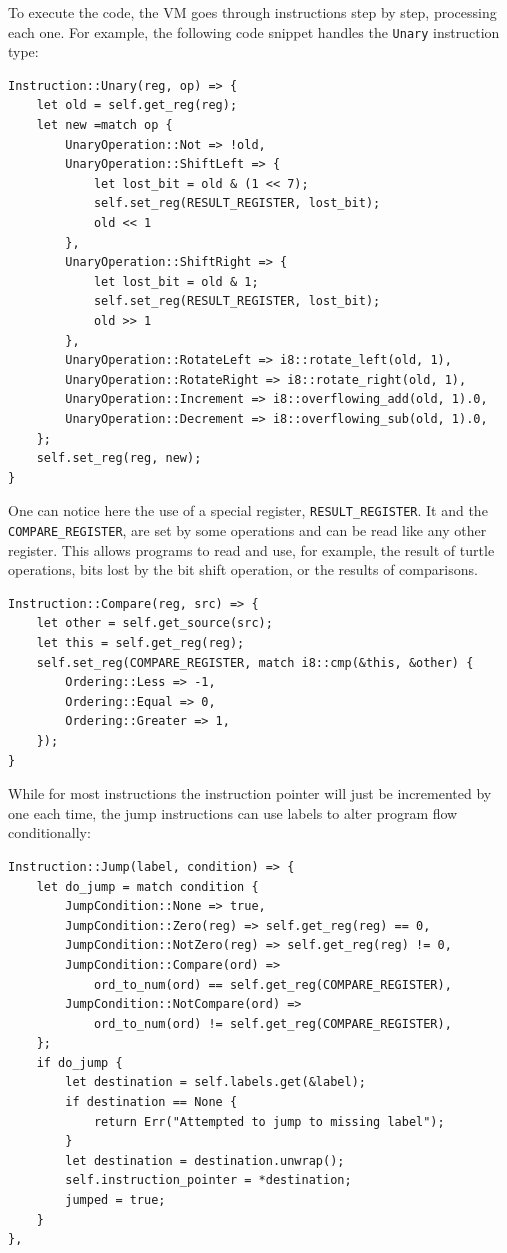 \documentclass{report}
\begin{document}
To execute the code, the VM goes through instructions step by step, processing each one. For example, the following code snippet handles the \verb|Unary| instruction type:

\begin{verbatim}
Instruction::Unary(reg, op) => {
    let old = self.get_reg(reg);
    let new =match op {
        UnaryOperation::Not => !old,
        UnaryOperation::ShiftLeft => {
            let lost_bit = old & (1 << 7);
            self.set_reg(RESULT_REGISTER, lost_bit);
            old << 1
        },
        UnaryOperation::ShiftRight => {
            let lost_bit = old & 1;
            self.set_reg(RESULT_REGISTER, lost_bit);
            old >> 1
        },
        UnaryOperation::RotateLeft => i8::rotate_left(old, 1),
        UnaryOperation::RotateRight => i8::rotate_right(old, 1),
        UnaryOperation::Increment => i8::overflowing_add(old, 1).0,
        UnaryOperation::Decrement => i8::overflowing_sub(old, 1).0,
    };
    self.set_reg(reg, new);
}
\end{verbatim}

One can notice here the use of a special register, \verb|RESULT_REGISTER|. It and the \verb|COMPARE_REGISTER|, are set by some operations and can be read like any other register. This allows programs to read and use, for example, the result of turtle operations, bits lost by the bit shift operation, or the results of comparisons.

\begin{verbatim}
Instruction::Compare(reg, src) => {
    let other = self.get_source(src);
    let this = self.get_reg(reg);
    self.set_reg(COMPARE_REGISTER, match i8::cmp(&this, &other) {
        Ordering::Less => -1,
        Ordering::Equal => 0,
        Ordering::Greater => 1,
    });
}
\end{verbatim}

While for most instructions the instruction pointer will just be incremented by one each time, the jump instructions can use labels to alter program flow conditionally:

\begin{verbatim}
Instruction::Jump(label, condition) => {
    let do_jump = match condition {
        JumpCondition::None => true,
        JumpCondition::Zero(reg) => self.get_reg(reg) == 0,
        JumpCondition::NotZero(reg) => self.get_reg(reg) != 0,
        JumpCondition::Compare(ord) =>
            ord_to_num(ord) == self.get_reg(COMPARE_REGISTER),
        JumpCondition::NotCompare(ord) =>
            ord_to_num(ord) != self.get_reg(COMPARE_REGISTER),
    };
    if do_jump {
        let destination = self.labels.get(&label);
        if destination == None {
            return Err("Attempted to jump to missing label");
        }
        let destination = destination.unwrap();
        self.instruction_pointer = *destination;
        jumped = true;
    }
},
\end{verbatim}
\end{document}
